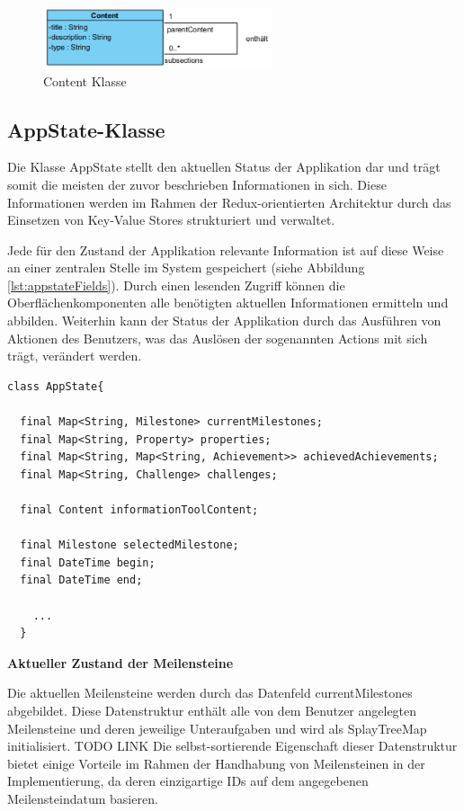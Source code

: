 \documentclass[bibliography=totoc,listof=totoc,BCOR=5mm,DIV=12,oneside]{scrbook}
\begin{document}
\begin{figure}[H]
	\centering
	\includegraphics[width=0.6\textwidth, keepaspectratio]{Bilder/ClassContent.png}
	\caption{Content Klasse}
	\label{img:contentClass}
\end{figure}

\newpage
\subsection{AppState-Klasse}
\par Die Klasse AppState stellt den aktuellen Status der Applikation dar und trägt somit die meisten der zuvor beschrieben Informationen in sich. Diese Informationen werden im Rahmen der Redux-orientierten Architektur durch das Einsetzen von Key-Value Stores strukturiert und verwaltet. 

\par \medskip Jede für den Zustand der Applikation relevante Information ist auf diese Weise an einer zentralen Stelle im System gespeichert (siehe Abbildung \ref{lst:appstateFields}). Durch einen lesenden Zugriff können die Oberflächenkomponenten alle benötigten aktuellen Informationen ermitteln und abbilden. Weiterhin kann der Status der Applikation durch das Ausführen von Aktionen des Benutzers, was das Auslösen der sogenannten Actions mit sich trägt, verändert werden.
  
  \bigskip
\begin{lstlisting}[caption={Datenfelder der Klasse Appstate},captionpos=b, label=lst:appstateFields]
class AppState{

  final Map<String, Milestone> currentMilestones;
  final Map<String, Property> properties;
  final Map<String, Map<String, Achievement>> achievedAchievements;
  final Map<String, Challenge> challenges;
  
  final Content informationToolContent;
  
  final Milestone selectedMilestone;
  final DateTime begin;
  final DateTime end;

	...
  }
\end{lstlisting}
\bigskip

\par \bigskip \textbf{Aktueller Zustand der Meilensteine}
\par Die aktuellen Meilensteine werden durch das Datenfeld currentMilestones abgebildet. Diese Datenstruktur enthält alle von dem Benutzer angelegten Meilensteine und deren jeweilige Unteraufgaben und wird als SplayTreeMap initialisiert. TODO LINK Die selbst-sortierende Eigenschaft dieser Datenstruktur bietet einige Vorteile im Rahmen der Handhabung von Meilensteinen in der Implementierung, da deren einzigartige IDs auf dem angegebenen Meilensteindatum basieren.
\end{document}
